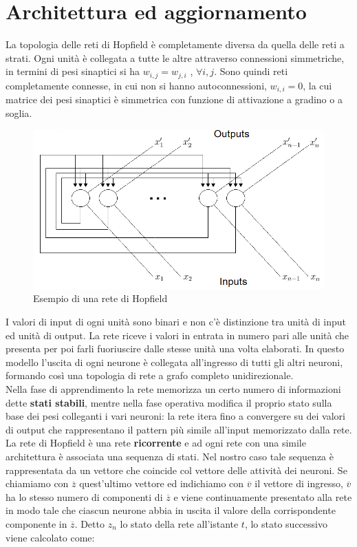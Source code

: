 \documentclass[12pt,a4paper,oneside]{book}
\begin{document}
	\section{Architettura ed aggiornamento}

	La topologia delle reti di Hopfield è completamente diversa da quella delle reti a strati. Ogni unità è collegata a tutte le altre attraverso connessioni simmetriche, in termini di pesi sinaptici si ha $w_{i,j} = w_{j,i}$ , $\forall i,j$. Sono quindi reti completamente connesse, in cui non si hanno autoconnessioni, $w_{i,i}=0$, la cui matrice dei pesi sinaptici è simmetrica con funzione di attivazione a gradino o a soglia. \\
	
	\begin{figure}[h]
		\centering
		\includegraphics[width=0.9\linewidth]{IMMAGINI/hopfield}
		\caption{Esempio di una rete di Hopfield}
		\label{fig:hopfield}
	\end{figure}

	I valori di input di ogni unità sono binari e non c'è distinzione tra unità di input ed unità di output. La rete riceve i valori in entrata in numero pari alle unità che presenta per poi farli fuoriuscire dalle stesse unità una volta elaborati. In questo modello l'uscita di ogni neurone è collegata all'ingresso di tutti gli altri neuroni, formando così una topologia di rete a grafo completo unidirezionale.\\
	Nella fase di apprendimento la rete memorizza un certo numero di informazioni dette \textbf{stati stabili}, mentre nella fase operativa modifica il proprio stato sulla base dei pesi colleganti i vari neuroni: la rete itera fino a convergere su dei valori di output che rappresentano il pattern più simile all'input memorizzato dalla rete.\\
	La rete di Hopfield è una rete \textbf{ricorrente} e ad ogni rete con una simile architettura è associata una sequenza di stati. Nel nostro caso tale sequenza è rappresentata da un vettore che coincide col vettore delle attività dei neuroni. Se chiamiamo con $\overline z$ quest'ultimo vettore ed indichiamo con $\overline v$ il vettore di ingresso, $\overline v$ ha lo stesso numero di componenti di $\overline z$ e viene continuamente presentato alla rete in modo tale che ciascun neurone abbia in uscita il valore della corrispondente componente in $\overline z$. Detto $z_{n}$ lo stato della rete all'istante $t$, lo stato successivo viene calcolato come:
\end{document}
